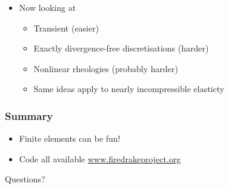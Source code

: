 \documentclass[presentation, 10pt]{beamer}
\begin{document}
\begin{frame}
\begin{itemize}
\begin{columns}
\begin{column}{0.4\pagewidth}
      \end{column}
    \end{columns}
  \item Now looking at
    \begin{itemize}
    \item Transient (easier)
    \item Exactly divergence-free discretisations (harder)
    \item Nonlinear rheologies (probably harder)
    \item Same ideas apply to nearly incompressible elasticty
    \end{itemize}
  \end{itemize}
\end{frame}

\begin{frame}
  \frametitle{Summary}
  \begin{itemize}
  \item Finite elements can be fun!
  \item Code all available \url{www.firedrakeproject.org}
  \end{itemize}

  \begin{center}
    \LARGE

    Questions?
  \end{center}
\end{frame}
\end{document}

